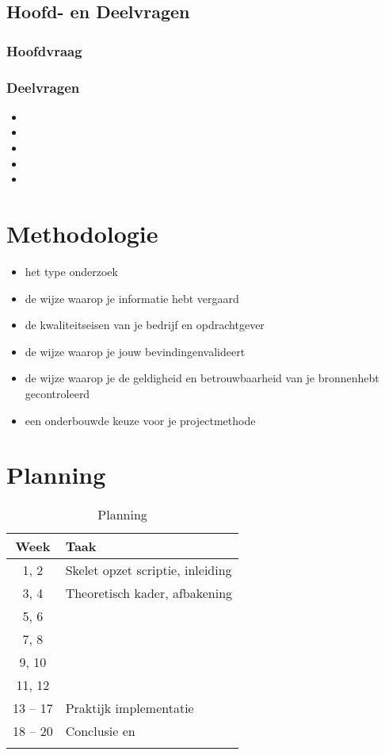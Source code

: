 \subsection{Hoofd- en Deelvragen}
\subsubsection{Hoofdvraag}
\hoofdvraagname

\subsubsection{Deelvragen}
\begin{itemize}
	\item \deelhuidig
	\item \deeltechnieken
	\item \deelverbetering
	\item \deelimplementatie
	\item \deelrequirements
\end{itemize}

\section{Methodologie}
\begin{itemize}
	\item het type onderzoek
	\item de wijze waarop je informatie hebt vergaard
	\item de kwaliteitseisen van je bedrijf en opdrachtgever
	\item de wijze waarop je jouw bevindingenvalideert 
	\item de wijze waarop je de geldigheid en betrouwbaarheid van je bronnenhebt gecontroleerd
	\item een onderbouwde keuze voor je projectmethode
\end{itemize}

\section{Planning}
\begin{table}[h]
	\caption{Planning}
	\label{tab:planning}
	\centering
	\begin{tabular}{c p{12cm}}
		\toprule
		\textbf{Week} & \textbf{Taak}\\
		\midrule
			1, 2 & Skelet opzet scriptie, inleiding \\
			3, 4 & Theoretisch kader, afbakening \\
			5, 6 & \deelhuidig \\
			7, 8 & \deeltechnieken \\
			9, 10 & \deelverbetering \\
			11, 12 & \deelimplementatie \\
			13 -- 17 & Praktijk implementatie \\
			18 -- 20 & Conclusie en \deelrequirements \\
		\bottomrule\\
	\end{tabular}
\end{table}
